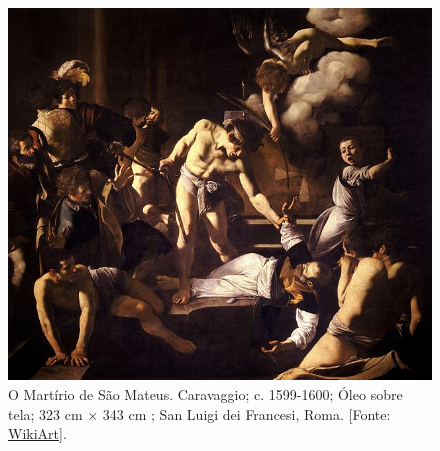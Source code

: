 \begin{figure}[H]
	\centering
	\includegraphics[width=0.7\linewidth]{Figuras/Artigo2/m7.jpg}
	\protect\caption{O Martírio de São Mateus. Caravaggio; c. 1599-1600; Óleo sobre tela; 323 cm × 343 cm ; San Luigi dei Francesi, Roma. [Fonte: \href{https://www.wikiart.org/pt/caravaggio}{WikiArt}].}
	\label{fig:m4}
\end{figure}

